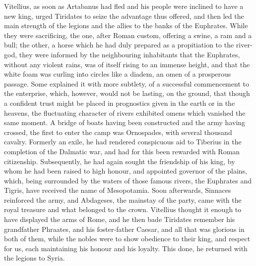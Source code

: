 Vitellius, as soon as Artabanus had fled and his people were inclined to have a new king, urged Tiridates to seize the advantage thus offered, and then led the main strength of the legions and the allies to the banks of the Euphrates. While they were sacrificing, the one, after Roman custom, offering a swine, a ram and a bull; the other, a horse which he had duly prepared as a propitiation to the river-god, they were informed by the neighbouring inhabitants that the Euphrates, without any violent rains, was of itself rising to an immense height, and that the white foam was curling into circles like a diadem, an omen of a prosperous passage. Some explained it with more subtlety, of a successful commencement to the enterprise, which, however, would not be lasting, on the ground, that though a confident trust might be placed in prognostics given in the earth or in the heavens, the fluctuating character of rivers exhibited omens which vanished the same moment. A bridge of boats having been constructed and the army having crossed, the first to enter the camp was Ornospades, with several thousand cavalry. Formerly an exile, he had rendered conspicuous aid to Tiberius in the completion of the Dalmatic war, and had for this been rewarded with Roman citizenship. Subsequently, he had again sought the friendship of his king, by whom he had been raised to high honour, and appointed governor of the plains, which, being surrounded by the waters of those famous rivers, the Euphrates and Tigris, have received the name of Mesopotamia. Soon afterwards, Sinnaces reinforced the army, and Abdageses, the mainstay of the party, came with the royal treasure and what belonged to the crown. Vitellius thought it enough to have displayed the arms of Rome, and he then bade Tiridates remember his grandfather Phraates, and his foster-father Caesar, and all that was glorious in both of them, while the nobles were to show obedience to their king, and respect for us, each maintaining his honour and his loyalty. This done, he returned with the legions to Syria.


